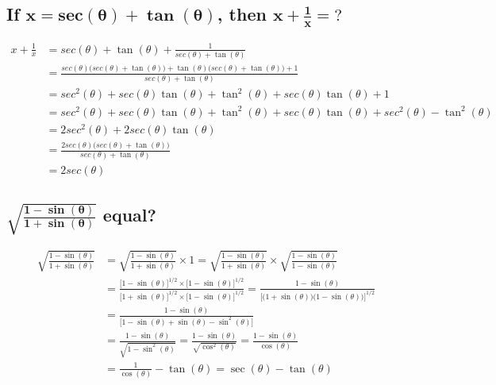 \documentclass{article}
\begin{document}
\subsection{If $\mathbf{x = sec(\theta) + \tan(\theta)}$, then $\mathbf{x + \frac{1}{x}=?}$}
\begin{align*}
    x + \frac{1}{x} &= sec(\theta) + \tan(\theta) + \frac{1}{sec(\theta) + \tan(\theta)} \\
                    &= \frac{sec(\theta)\Big(sec(\theta) + \tan(\theta)\Big) + \tan(\theta)\Big(sec(\theta) + \tan(\theta)\Big) + 1}{sec(\theta) + \tan(\theta)} \\
                    &= sec^2(\theta) + sec(\theta)\tan(\theta) + \tan^2(\theta) +  sec(\theta)\tan(\theta) + 1 \\
                    &= sec^2(\theta) + sec(\theta)\tan(\theta) + \tan^2(\theta) +  sec(\theta)\tan(\theta) + sec^2(\theta) - \tan^2(\theta) \\
                    &= 2sec^2(\theta) + 2sec(\theta)\tan(\theta) \\
                    &= \frac{2sec(\theta)\Big(sec(\theta) + \tan(\theta)\Big)}{sec(\theta) + \tan(\theta)} \\
                    &= 2sec(\theta)
\end{align*}

\subsection{$\mathbf{\sqrt{\frac{1-\sin(\theta)}{1+\sin(\theta)}}}$ equal?}
\begin{align*}
    \sqrt{\frac{1-\sin(\theta)}{1+\sin(\theta)}} &= \sqrt{\frac{1-\sin(\theta)}{1+\sin(\theta)}} \times 1 = \sqrt{\frac{1-\sin(\theta)}{1+\sin(\theta)}} \times \sqrt{\frac{1-\sin(\theta)}{1 - \sin(\theta)}} \\
    &= \frac{\Big[1 - \sin(\theta) \Big]^{1/2} \times \Big[1 - \sin(\theta) \Big]^{1/2}}{\Big[1 + \sin(\theta) \Big]^{1/2} \times \Big[1 - \sin(\theta) \Big]^{1/2}} = \frac{1-\sin(\theta)}{\Bigg[\Big(1+\sin(\theta)\Big) \Big(1-\sin(\theta)\Big)\Bigg]^{1/2}} \\
    &= \frac{1-\sin(\theta)}{\Big[1-\sin(\theta)+\sin(\theta)-\sin^2(\theta) \Big]} \\
    &= \frac{1-\sin(\theta)}{\sqrt{1-\sin^2(\theta)}} = \frac{1-\sin(\theta)}{\sqrt{\cos^2(\theta)}} = \frac{1-\sin(\theta)}{\cos(\theta)} \\
    &= \frac{1}{\cos(\theta)} - \tan(\theta) = \sec(\theta) - \tan(\theta)
\end{align*}
\end{document}
